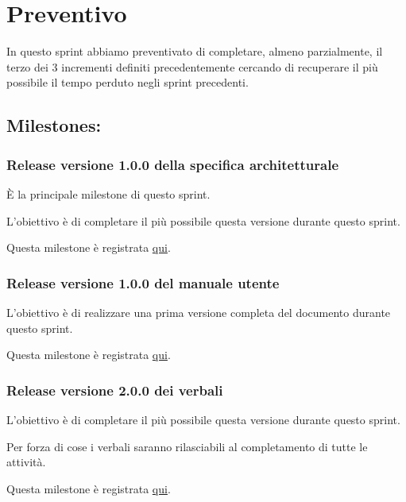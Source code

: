 \section{Preventivo}

In questo sprint abbiamo preventivato di completare, almeno parzialmente, il terzo dei 3 incrementi definiti precedentemente cercando di recuperare il più possibile il tempo perduto negli sprint precedenti.

\subsection{Milestones:}  

\subsubsection{Release versione 1.0.0 della specifica architetturale}

È la principale milestone di questo sprint.

L'obiettivo è di completare il più possibile questa versione durante questo sprint.

Questa milestone è registrata \href{https://github.com/SWEasabi/specifica-architetturale/milestone/1}{qui}.

\subsubsection{Release versione 1.0.0 del manuale utente}

L'obiettivo è di realizzare una prima versione completa del documento durante questo sprint.

Questa milestone è registrata \href{https://github.com/SWEasabi/manuale-utente/milestone/1}{qui}.

\subsubsection{Release versione 2.0.0 dei verbali}

L'obiettivo è di completare il più possibile questa versione durante questo sprint.

Per forza di cose i verbali saranno rilasciabili al completamento di tutte le attività.

Questa milestone è registrata \href{https://github.com/SWEasabi/verbali/milestone/1}{qui}.